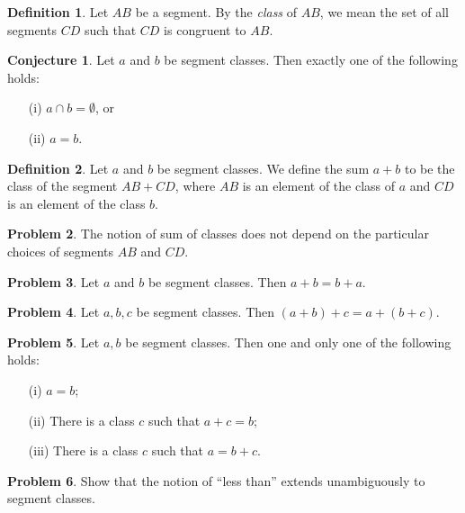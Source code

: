 \documentclass{amsart}
\theoremstyle{definition}
\newtheorem{problem}{Problem}[section]
\newtheorem{conjecture}[problem]{Conjecture}
\newtheorem*{definition}{Definition}
\begin{document}
\begin{definition}\label{defn:segment-class} 
Let $AB$ be a segment. By the \emph{class} of $AB$, we mean the set of all segments $CD$ such that $CD$ is congruent to $AB$.
\end{definition}

\begin{conjecture} Let $a$ and $b$ be segment classes. Then exactly one of the following holds:
\begin{itemize}
\item[(i)] $a\cap b = \emptyset$, or
\item[(ii)] $a = b$.
\end{itemize}
\end{conjecture}


\begin{definition}\label{defn:sum-segment-classes} 
Let $a$ and $b$ be segment classes. We define the sum $a+b$ to be the class of the segment $AB+CD$, where $AB$ is an element of the class of $a$ and $CD$ is an element of the class $b$.
\end{definition}

\begin{problem} 
The notion of sum of classes does not depend on the particular choices of segments $AB$ and $CD$.
\end{problem}


\begin{problem}
Let $a$ and $b$ be segment classes. Then $a+b = b+a$.
\end{problem}

\begin{problem}
Let $a, b, c$ be segment classes. Then $(a+b)+c = a + (b+c)$.
\end{problem}

\begin{problem} 
Let $a, b$ be segment classes. Then one and only one of the following holds:
\begin{itemize}
\item[(i)] $a=b$;
\item[(ii)] There is a class $c$ such that $a+c=b$;
\item[(iii)] There is a class $c$ such that $a= b+c$.
\end{itemize}
\end{problem}

\begin{problem} 
Show that the notion of ``less than'' extends unambiguously to segment classes.
\end{problem}
\end{document}
